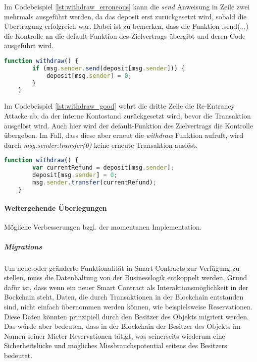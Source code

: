 Im Codebeispiel \ref{lst:withdraw_erroneous} kann die \emph{send} Anweisung in Zeile zwei mehrmals ausgeführt werden, da das deposit erst zurückgesetzt wird, sobald die Übertragung erfolgreich war. Dabei ist zu bemerken, dass die Funktion .send(...) die Kontrolle an die default-Funktion des Zielvertrags übergibt und deren Code ausgeführt wird.
\begin{lstlisting}[language=javascript,caption={fehlerhaftes Code Snippet \protected{\cite[Common Patterns/Withdrawal From Contrats]{solidity.readthedocs.io}}},label={lst:withdraw_erroneous}]
    function withdraw() {
        if (msg.sender.send(deposit[msg.sender])) {
            deposit[msg.sender] = 0;
        }
    }
\end{lstlisting}

Im Codebeispiel \ref{lst:withdraw_good} wehrt die dritte Zeile die Re-Entrancy Attacke ab, da der interne Kontostand zurückgesetzt wird, bevor die Transaktion ausgelöst wird. Auch hier wird der default-Funktion des Zielvertrags die Kontrolle übergeben. Im Fall, dass diese aber erneut die \emph{withdraw} Funktion aufruft, wird durch \emph{msg.sender.transfer(0)} keine erneute Transaktion auslöst.
\begin{lstlisting}[language=javascript,caption={empfohlenes Code Snippet \protected{\cite[Common Patterns/Withdrawal From Contrats]{solidity.readthedocs.io}}},label={lst:withdraw_good}]
    function withdraw() {
        var currentRefund = deposit[msg.sender];
        deposit[msg.sender] = 0;
        msg.sender.transfer(currentRefund);
    }
\end{lstlisting}

\paragraph{Weitergehende Überlegungen}
Mögliche Verbesserungen bzgl. der momentanen Implementation.

\subparagraph{Migrations}
Um neue oder geänderte Funktionalität in Smart Contracts zur Verfügung zu stellen, muss die Datenhaltung von der Businesslogik entkoppelt werden. Grund dafür ist, dass wenn ein neuer Smart Contract als Interaktionsmöglichkeit in der Bockchain steht, Daten, die durch Transaktionen in der Blockchain entstanden sind, nicht einfach übernommen werden können, wie beispielsweise Reservationen. Diese Daten könnten prinzipiell durch den Besitzer des Objekts migriert werden. Das würde aber bedeuten, dass in der Blockchain der Besitzer des Objekts im Namen seiner Mieter Reservationen tätigt, was seinerseits wiederum eine Sicherheitslücke und mögliches Missbrauchspotential seitens des Besitzers bedeutet.

